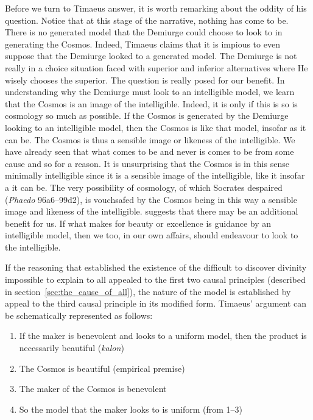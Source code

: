 Before we turn to Timaeus answer, it is worth remarking about the oddity of his question. Notice that at this stage of the narrative, nothing has come to be. There is no generated model that the Demiurge could choose to look to in generating the Cosmos. Indeed, Timaeus claims that it is impious to even suppose that the Demiurge looked to a generated model. The Demiurge is not really in a choice situation faced with superior and inferior alternatives where He wisely chooses the superior. The question is really posed for our benefit. In understanding why the Demiurge must look to an intelligible model, we learn that the Cosmos is an image of the intelligible. Indeed, it is only if this is so is cosmology so much as possible. If the Cosmos is generated by the Demiurge looking to an intelligible model, then the Cosmos is like that model, insofar as it can be. The Cosmos is thus a sensible image or likeness of the intelligible. We have already seen that what comes to be and never is comes to be from some cause and so for a reason. It is unsurprising that the Cosmos is in this sense minimally intelligible since it is a sensible image of the intelligible, like it insofar a it can be. The very possibility of cosmology, of which Socrates despaired (\emph{Phaedo} 96a6–99d2), is vouchsafed by the Cosmos being in this way a sensible image and likeness of the intelligible. \citet[28--9]{Broadie:2012vl} suggests that there may be an additional benefit for us. If what makes for beauty or excellence is guidance by an intelligible model, then we too, in our own affairs, should endeavour to look to the intelligible.

If the reasoning that established the existence of the difficult to discover divinity impossible to explain to all appealed to the first two causal principles (described in section~\ref{sec:the_cause_of_all}), the nature of the model is established by appeal to the third causal principle in its modified form. Timaeus' argument can be schematically represented as follows:
\begin{enumerate}[(1)]
	\item If the maker is benevolent and looks to a uniform model, then the product is necessarily beautiful (\emph{kalon})
	\item The Cosmos is beautiful (empirical premise)
	\item The maker of the Cosmos is benevolent
	\item So the model that the maker looks to is uniform (from 1--3)
\end{enumerate}

